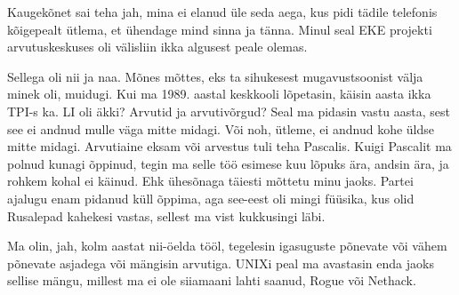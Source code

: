 Kaugekõnet sai teha jah, mina ei elanud üle seda aega, kus pidi tädile 
telefonis kõigepealt ütlema, et ühendage mind sinna ja tänna. Minul seal EKE 
projekti arvutuskeskuses oli  välisliin ikka algusest peale olemas. 


Sellega oli nii ja naa. Mõnes mõttes, eks ta sihukesest mugavustsoonist välja 
minek oli, muidugi. Kui ma 1989. aastal  keskkooli lõpetasin, käisin aasta ikka 
TPI-s ka. LI oli äkki? Arvutid ja 
arvutivõrgud? Seal ma pidasin vastu aasta, sest see ei andnud mulle väga mitte 
midagi. Või noh, ütleme, ei andnud kohe üldse mitte midagi. Arvutiaine eksam 
või arvestus tuli teha Pascalis. Kuigi Pascalit ma polnud 
kunagi õppinud, tegin ma selle töö esimese kuu lõpuks ära, andsin ära, ja 
rohkem kohal ei käinud. Ehk ühesõnaga täiesti mõttetu minu jaoks. Partei 
ajalugu enam pidanud küll õppima, aga see-eest oli  mingi füüsika, kus olid 
Rusalepad kahekesi 
vastas, sellest ma vist kukkusingi läbi.


Ma olin, jah, kolm aastat nii-öelda  tööl, tegelesin igasuguste põnevate  või 
vähem põnevate asjadega või mängisin arvutiga. UNIXi peal ma avastasin enda 
jaoks sellise mängu, millest ma ei ole siiamaani lahti saanud, 
Rogue või Nethack.

       

